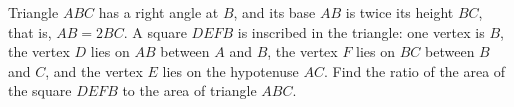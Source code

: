 Triangle $ABC$ has a right angle at $B$, and its base $AB$ is twice its height $BC$, that is, $AB=2BC$. A square $DEFB$ is inscribed in the triangle: one vertex is $B$, the vertex $D$ lies on $AB$ between $A$ and $B$, the vertex $F$ lies on $BC$ between $B$ and $C$, and the vertex $E$ lies on the hypotenuse $AC$. Find the ratio of the area of the square $DEFB$ to the area of triangle $ABC$.
